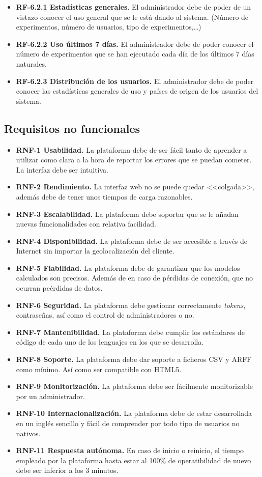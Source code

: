 \begin{itemize}
\begin{itemize}
\begin{itemize}
		\item \textbf{RF-6.2.1 Estadísticas generales}. El administrador debe de poder de un vistazo conocer el uso general que se le está dando al sistema. (Número de experimentos, número de usuarios, tipo de experimentos,\dots)
		\item \textbf{RF-6.2.2 Uso últimos 7 días.} El administrador debe de poder conocer el número de experimentos que se han ejecutado cada día de los últimos 7 días naturales.
		\item \textbf{RF-6.2.3 Distribución de los usuarios.} El administrador debe de poder conocer las estadísticas generales de uso y países de origen de los usuarios del sistema.
	\end{itemize}
	\end{itemize}
\end{itemize}
\pagebreak
\subsection{Requisitos no funcionales}\label{requisitos-no-funcionales}
\begin{itemize}
\item \textbf{RNF-1 Usabilidad.} La plataforma debe de ser fácil tanto de aprender a utilizar como clara a la hora de reportar los errores que se puedan cometer. La interfaz debe ser intuitiva.
\item \textbf{RNF-2 Rendimiento.} La interfaz web no se puede quedar <<colgada>>, además debe de tener unos tiempos de carga razonables.
\item \textbf{RNF-3 Escalabilidad.} La plataforma debe soportar que se le añadan nuevas funcionalidades con relativa facilidad.
\item \textbf{RNF-4 Disponibilidad.} La plataforma debe de ser accesible a través de Internet sin importar la geolocalización del cliente.
\item \textbf{RNF-5 Fiabilidad.} La plataforma debe de garantizar que los modelos calculados son precisos. Además de en caso de pérdidas de conexión, que no ocurran peérdidas de datos.
\item \textbf{RNF-6 Seguridad.} La plataforma debe gestionar correctamente \textit{tokens}, contraseñas, así como el control de administradores o no.
\item \textbf{RNF-7 Mantenibilidad.} La plataforma debe cumplir los estándares de código de cada uno de los lenguajes en los que se desarrolla. 
\item \textbf{RNF-8 Soporte.} La plataforma debe dar soporte a ficheros CSV y ARFF como mínimo. Así como ser compatible con HTML5.
\item \textbf{RNF-9 Monitorización.} La plataforma debe ser fácilmente monitorizable por un administrador.
\item \textbf{RNF-10 Internacionalización.} La plataforma debe de estar desarrollada en un inglés sencillo y fácil de comprender por todo tipo de usuarios no nativos.
\item \textbf{RNF-11 Respuesta autónoma.} En caso de inicio o reinicio, el tiempo empleado por la plataforma hasta estar al 100\% de operatibilidad de nuevo debe ser inferior a los 3 minutos.
\end{itemize}
\newpage
